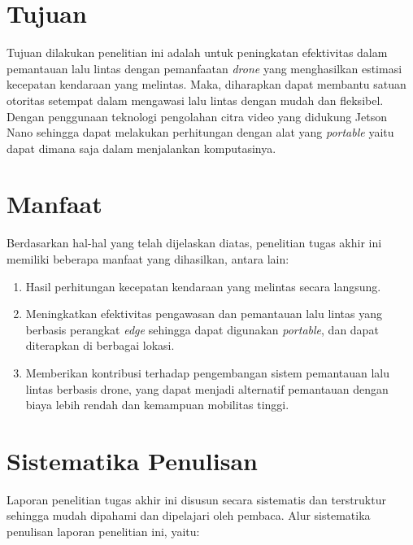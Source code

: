 \section{Tujuan}
Tujuan dilakukan penelitian ini adalah untuk peningkatan efektivitas dalam pemantauan lalu lintas dengan pemanfaatan \emph{drone} yang menghasilkan estimasi kecepatan kendaraan yang melintas. Maka, diharapkan dapat membantu satuan otoritas setempat dalam mengawasi lalu lintas dengan mudah dan fleksibel. Dengan penggunaan teknologi pengolahan citra video yang didukung Jetson Nano sehingga dapat melakukan perhitungan dengan alat yang \emph{portable} yaitu dapat dimana saja dalam menjalankan komputasinya.
 
\section{Manfaat}
Berdasarkan hal-hal yang telah dijelaskan diatas, penelitian tugas akhir ini memiliki beberapa manfaat yang dihasilkan, antara lain:
\begin{enumerate}
    \item Hasil perhitungan kecepatan kendaraan yang melintas secara langsung.
    \item Meningkatkan efektivitas pengawasan dan pemantauan lalu lintas yang berbasis perangkat \emph{edge} sehingga dapat digunakan \emph{portable}, dan dapat diterapkan di berbagai lokasi.
    \item Memberikan kontribusi terhadap pengembangan sistem pemantauan lalu lintas berbasis drone, yang dapat menjadi alternatif pemantauan dengan biaya lebih rendah dan kemampuan mobilitas tinggi.
\end{enumerate}

\section{Sistematika Penulisan}
Laporan penelitian tugas akhir ini disusun secara sistematis dan terstruktur sehingga mudah dipahami dan dipelajari oleh pembaca. Alur sistematika penulisan laporan penelitian ini, yaitu:

